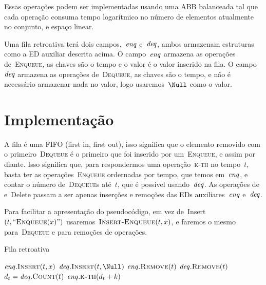 \documentclass[main.tex]{subfiles}
\begin{document}
Essas operações podem ser implementadas usando uma ABB balanceada tal que cada operação consuma tempo logarítmico no número de elementos atualmente no conjunto, e espaço linear.

\newcommand{\deqs}{\V{deq}}
\newcommand{\enqs}{\V{enq}}

Uma fila retroativa terá dois campos,~$\enqs$ e~$\deqs$, ambos armazenam estruturas como a ED auxiliar descrita acima. O campo~$\enqs$ armazena as operações de~\textsc{Enqueue}, as chaves são o tempo e o valor é o valor inserido na fila. O campo~$\deqs$ armazena as operações de~\textsc{Dequeue}, as chaves são o tempo, e não é necessário armazenar nada no valor, logo usaremos~$\Null$ como o valor.

\section{Implementação}

A fila é uma FIFO (first in, first out), isso significa que o elemento removido com o primeiro~\textsc{Dequeue} é o primeiro que foi inserido por um~\textsc{Enqueue}, e assim por diante. Isso significa que, para respondermos uma operação~\textsc{k-th} no tempo~$t$, basta ter as operações~\textsc{Enqueue} ordernadas por tempo, que temos em~$\enqs$, e contar o número de~\textsc{Dequeue}s até~$t$, que é possível usando~$\deqs$. As operações de~ e~Delete passam a ser apenas inserções e remoções das EDs auxiliares~$\enqs$ e~$\deqs$.

Para facilitar a apresentação do pseudocódigo, em vez de~Insert$(t, ``\Call{Enqueue}{x}")$ usaremos~$\Call{Insert-Enqueue}{t, x}$, e faremos o mesmo para~\textsc{Dequeue} e para remoções de operações.

\begin{algorithm}
\caption{Fila retroativa} \label{lst:filaretro}
\begin{algorithmic}[1]
		\State $\enqs.\Call{Insert}{t, x}$
	\EndFunction
		\State $\deqs.\Call{Insert}{t, \Null}$
	\EndFunction
		\State $\enqs.\Call{Remove}{t}$
	\EndFunction
		\State $\deqs.\Call{Remove}{t}$
	\EndFunction
		\State $d_t = \deqs.\Call{Count}{t}$
		\State \Return $\enqs.\Call{k-th}{d_t + k}$
	\EndFunction
\end{algorithmic}
\end{algorithm}
\end{document}
